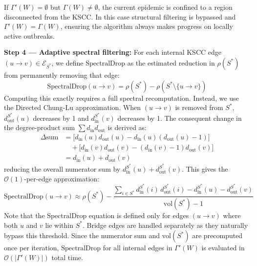 \documentclass[conference]{IEEEtran}
\begin{document}
If $\Gamma'(W) = \emptyset$ but $\Gamma(W) \neq \emptyset$, the current epidemic is confined to a region disconnected from the KSCC. In this case structural filtering is bypassed and $\Gamma'(W) = \Gamma(W)$, ensuring the algorithm always makes progress on locally active outbreaks.

\vspace{0.5em}

\textbf{Step 4 — Adaptive spectral filtering:}  
For each internal KSCC edge $(u \to v) \in \mathcal{E}_{S^*}$, we define $\mathrm{SpectralDrop}$ as the estimated reduction in $\rho(S^*)$ from permanently removing that edge:
\begin{equation}
\mathrm{SpectralDrop}(u{\to}v) = \rho(S^*) - \rho(S^* \setminus \{u{\to}v\})
\end{equation}
Computing this exactly requires a full spectral recomputation. Instead, we use the Directed Chung-Lu approximation. When $(u \to v)$ is removed from $S^*$, $d_{\mathrm{out}}^{S^*}(u)$ decreases by 1 and $d_{\mathrm{in}}^{S^*}(v)$ decreases by 1. The consequent change in the degree-product sum $\sum d_{\mathrm{in}} d_{\mathrm{out}}$ is derived as:
\begin{align*}
\Delta \text{sum} &= \bigl[ d_{\mathrm{in}}(u) d_{\mathrm{out}}(u) - d_{\mathrm{in}}(u) (d_{\mathrm{out}}(u)-1) \bigr] \\
&\quad + \bigl[ d_{\mathrm{in}}(v) d_{\mathrm{out}}(v) - (d_{\mathrm{in}}(v)-1) d_{\mathrm{out}}(v) \bigr] \\
&= d_{\mathrm{in}}(u) + d_{\mathrm{out}}(v)
\end{align*}
reducing the overall numerator sum by $d_{\mathrm{in}}^{S^*}(u) + d_{\mathrm{out}}^{S^*}(v)$. This gives the $\mathcal{O}(1)$-per-edge approximation:
\begin{equation}
\mathrm{SpectralDrop}(u{\to}v) \approx \rho(S^*) - \frac{\displaystyle\sum_{i \in S^*} d_{\mathrm{in}}^{S^*}(i)\,d_{\mathrm{out}}^{S^*}(i) - d_{\mathrm{in}}^{S^*}(u) - d_{\mathrm{out}}^{S^*}(v)}{\mathrm{vol}(S^*) - 1}
\end{equation}
Note that the $\mathrm{SpectralDrop}$ equation is defined only for edges $(u \to v)$ where both $u$ and $v$ lie within $S^*$. Bridge edges are handled separately as they naturally bypass this threshold. Since the numerator sum and $\mathrm{vol}(S^*)$ are precomputed once per iteration, $\mathrm{SpectralDrop}$ for all internal edges in $\Gamma'(W)$ is evaluated in $\mathcal{O}(|\Gamma'(W)|)$ total time.
\end{document}
